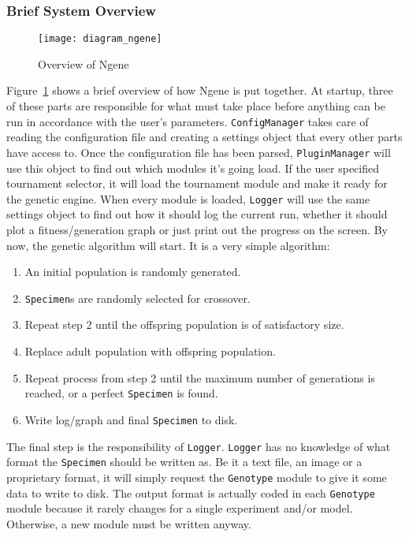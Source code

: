 \subsubsection{Brief System Overview}
\begin{figure}[!ht]
	\centering
	\texttt{[image: diagram\_ngene]}
	\caption{Overview of Ngene}
	\label{fig:diagram_ngene}
\end{figure}

Figure~\ref{fig:diagram_ngene} shows a brief overview of how Ngene is put together. At startup, three of these parts are responsible for what must take place before anything can be run in accordance with the user's parameters. \texttt{ConfigManager} takes care of reading the configuration file and creating a settings object that every other parts have access to. Once the configuration file has been parsed, \texttt{PluginManager} will use this object to find out which modules it's going load. If the user specified tournament selector, it will load the tournament module and make it ready for the genetic engine. When every module is loaded, \texttt{Logger} will use the same settings object to find out how it should log the current run, whether it should plot a fitness/generation graph or just print out the progress on the screen. By now, the genetic algorithm will start. It is a very simple algorithm:

\begin{enumerate}
	\itemsep=0pt
	\item An initial population is randomly generated.
	\item \texttt{Specimen}s are randomly selected for crossover.
	\item Repeat step 2 until the offspring population is of satisfactory size.
	\item Replace adult population with offspring population.
	\item Repeat process from step 2 until the maximum number of generations is reached, or a perfect \texttt{Specimen} is found.
	\item Write log/graph and final \texttt{Specimen} to disk.
\end{enumerate}

The final step is the responsibility of \texttt{Logger}. \texttt{Logger} has no knowledge of what format the \texttt{Specimen} should be written as. Be it a text file, an image or a proprietary format, it will simply request the \texttt{Genotype} module to give it some data to write to disk. The output format is actually coded in each \texttt{Genotype} module because it rarely changes for a single experiment and/or model. Otherwise, a new module must be written anyway.

